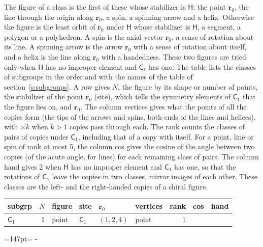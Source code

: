 \documentclass[10pt,a4paper]{article}
\newcommand{\needspace}[1]{\par\penalty-100\begingroup\dimen0=#1\relax\dimen2=\pagegoal
  \advance\dimen2-\pagetotal\ifdim\dimen0>\dimen2\relax\ifdim\dimen2>0pt\vfil\break\fi\fi
  \endgroup}
\numberwithin{equation}{section}
\newcommand{\grp}[1]{\mathsf{#1}}
\newcommand{\pointr}{\mathbf{r}}
\newlength{\fillwidth}\newlength{\cellwidth}\newlength{\colwidth}
\newcommand{\cellmax}[1]{\settowidth{\cellwidth}{#1}%
  \ifdim\cellwidth>\colwidth\setlength{\colwidth}{\cellwidth}\fi}
\newcommand{\fillcap}{\ifdim\colwidth<\fillwidth\setlength{\fillwidth}{\colwidth}\fi}
\begin{document}
\leavevmode\label{n:head.figure}The figure of a class is the first of these whose stabilizer is $\grp{H}$: the point $\pointr_0$, the line through the origin along $\pointr_0$, a spin, a spinning arrow and a helix. Otherwise the figure is the least orbit of $\pointr_0$ under $\grp{H}$ whose stabilizer is $\grp{H}$, a segment, a polygon or a polyhedron. A spin is the axial vector $\pointr_0$, a sense of rotation about its line. A spinning arrow is the arrow $\pointr_0$ with a sense of rotation about itself, and a helix is the line along $\pointr_0$ with a handedness. These two figures are tried only when $\grp{H}$ has no improper element and $\grp{C_{1}}$ has one. The table lists the classes of subgroups in the order and with the names of the table of section~\ref{s:subgroups}. \label{n:head.site}A row gives $N$, the figure by its shape or number of points, the stabilizer of the point $\pointr_0$ (site), which tells the symmetry elements of $\grp{C_{1}}$ that the figure lies on, and $\pointr_0$. \label{n:head.vertices}The column vertices gives what the points of all the copies form (the tips of the arrows and spins, both ends of the lines and helices), with ${\times}k$ when $k > 1$ copies pass through each. \label{n:head.rank}The rank counts the classes of pairs of copies under $\grp{C_{1}}$, including that of a copy with itself. \label{n:head.cos}For a point, line or spin of rank at most 5, the column cos gives the cosine of the angle between two copies (of the acute angle, for lines) for each remaining class of pairs. \label{n:head.hand}The column hand gives 2 when $\grp{H}$ has no improper element and $\grp{C_{1}}$ has one, so that the rotations of $\grp{C_{1}}$ leave the copies in two classes, mirror images of each other. These classes are the left- and the right-handed copies of a chiral figure.
{\small\setlength{\tabcolsep}{4pt}\setlength{\fillwidth}{\textwidth}\addtolength{\fillwidth}{-16\tabcolsep}\setlength{\colwidth}{0pt}\cellmax{subgrp}\cellmax{$\grp{C_{1}}$}\addtolength{\fillwidth}{-\colwidth}\setlength{\colwidth}{0pt}\cellmax{$N$}\cellmax{1}\addtolength{\fillwidth}{-\colwidth}\setlength{\colwidth}{0pt}\cellmax{figure}\cellmax{point}\addtolength{\fillwidth}{-\colwidth}\setlength{\colwidth}{0pt}\cellmax{site}\cellmax{$\grp{C_{1}}$}\addtolength{\fillwidth}{-\colwidth}\setlength{\colwidth}{0pt}\cellmax{$(1, 2, 4)$}\cellmax{$\pointr_0$}\addtolength{\fillwidth}{-\colwidth}\setlength{\colwidth}{0pt}\cellmax{vertices}\cellmax{point}\addtolength{\fillwidth}{-\colwidth}\setlength{\colwidth}{0pt}\cellmax{rank}\cellmax{1}\addtolength{\fillwidth}{-\colwidth}\setlength{\colwidth}{0pt}\cellmax{hand}\cellmax{}\addtolength{\fillwidth}{-\colwidth}\setlength{\colwidth}{0pt}\cellmax{cos}\fillcap\begin{longtable}{@{}lrllllr>{\RaggedRight\arraybackslash}p{\fillwidth}r@{}}\toprule
subgrp & $N$ & figure & site & $\pointr_0$ & vertices & rank & cos & hand\\\midrule\endhead
\bottomrule\endfoot\endlastfoot
\href{C1.pdf}{$\grp{C_{1}}$} & 1 & point & \href{C1.pdf}{$\grp{C_{1}}$} & $(1, 2, 4)$ & point & 1 &  & \\
\bottomrule\end{longtable}}
\needspace{147pt}
\end{document}
